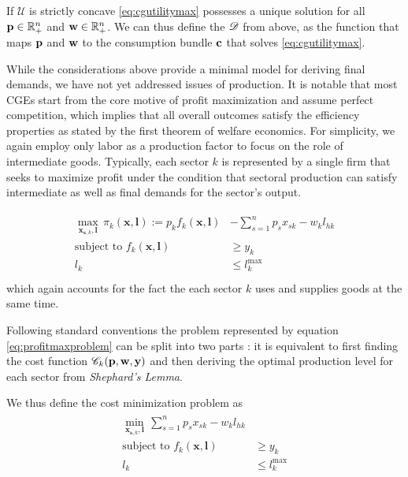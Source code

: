 If $\mathcal U$ is strictly concave \eqref{eq:cgutilitymax} possesses a unique solution for all $\mathbf{p} \in \mathbb R^n_+$ and $\mathbf{w} \in \mathbb R^n_+$.
We can thus define the $\mathscr{D}$ from above, as the function that maps $\mathbf{p}$ and $\mathbf{w}$ to the consumption bundle $\mathbf{c}$ that solves \eqref{eq:cgutilitymax}. 

While the considerations above provide a minimal model for deriving final demands, we have not yet addressed issues of production. 
It is notable that most CGEs start from the core motive of profit maximization and assume perfect competition, which implies that all overall outcomes satisfy the efficiency properties as stated by the first theorem of welfare economics. 
For simplicity, we again employ only labor as a production factor to focus on the role of intermediate goods. Typically, each sector $k$ is represented by a single firm that seeks to maximize profit under the condition that sectoral production can satisfy intermediate as well as final demands for the sector's output.

\begin{align}
  \label{eq:profitmaxproblem}
  \begin{split}
    \max_{\mathbf x_{\mathbf{s},k},\mathbf l}  \, \pi_{k}(\mathbf x,\mathbf l)  :=p_k f_k(\mathbf x,\mathbf l) &- \sum_{s = 1}^ n p_s x_{sk} - w_k l_{hk}  \\
  \text{subject to } f_k(\mathbf x, \mathbf l) &\geq y_k \\
  l_k &\leq  l^{\text{max}}_k\\
\end{split}
\end{align}
which again accounts for the fact the each sector $k$ uses and supplies goods at the same time. 

Following standard conventions the problem represented by equation \eqref{eq:profitmaxproblem} can be split into two parts \citep[][p.~146]{jehleAdvancedMicroeconomicTheory2011}:
it is equivalent to first finding the cost function $\mathscr{C}_k(\mathbf{p},\mathbf{w},\mathbf{y})$ and then deriving the optimal production level for each sector from \textit{Shephard's Lemma}.

We thus define the cost minimization problem as 
\begin{align}
  \label{eq:pricemin}
  \begin{split}
    \min_{\mathbf x_{\mathbf{s},k},\mathbf l}  \, \sum_{s = 1}^ n p_s x_{sk} - w_k l_{hk}  \\
  \text{subject to } f_k(\mathbf x, \mathbf l) &\geq y_k \\
  l_k &\leq  l^{\text{max}}_k\\
\end{split}
\end{align}

